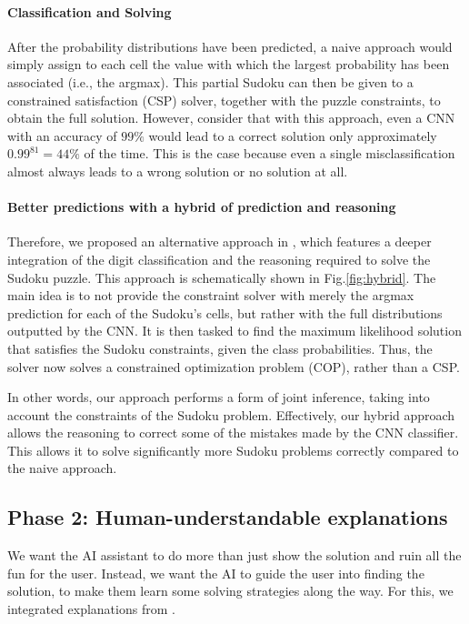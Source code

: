 \documentclass[letterpaper]{article} %
\begin{document}
\paragraph{Classification and Solving}
After the probability distributions have been predicted, a naive approach would simply assign to each cell the value with which the largest probability has been associated (i.e., the argmax). This partial Sudoku can then be given to a constrained satisfaction (CSP) solver, together with the puzzle constraints, to obtain the full solution. However, consider that with this approach, even a CNN with an accuracy of $99\%$ would lead to a correct solution only approximately $0.99^{81} = 44\%$ of the time. This is the case because even a single misclassification almost always leads to a wrong solution or no solution at all.

\paragraph{Better predictions with a hybrid of prediction and reasoning}
Therefore, we proposed an alternative approach in \cite{mulamba2020hybrid}, which features a deeper integration of the digit classification and the reasoning required to solve the Sudoku puzzle. This approach is schematically shown in Fig.\ref{fig:hybrid}. The main idea is to not provide the constraint solver with merely the argmax prediction for each of the Sudoku’s cells, but rather with the full distributions outputted by the CNN. It is then tasked to find the maximum likelihood solution that satisfies the Sudoku constraints, given the class probabilities. Thus, the solver now solves a constrained optimization problem (COP), rather than a CSP. 

In other words, our approach performs a form of joint inference, taking into account the constraints of the Sudoku problem.
Effectively, our hybrid approach allows the reasoning to correct some of the mistakes made by the CNN classifier. 
This allows it to solve significantly more Sudoku problems correctly compared to the naive approach.

\subsection{Phase 2: Human-understandable explanations}
 We want the AI assistant to do more than just show the solution and ruin all the fun for the user. Instead, we want the AI to guide the user into finding the solution, to make them learn some solving strategies along the way.
For this, we integrated explanations from \cite{stepwiseExplaining,OCUS}. 
\end{document}
